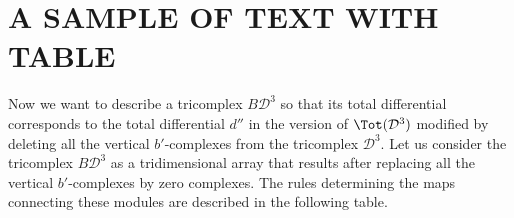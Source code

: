 \section{A SAMPLE OF TEXT WITH TABLE}\label{table}
\hspace{\parindent}
Now we want to describe a tricomplex $B{\mathcal D}^3$
so that its total differential corresponds to the total differential $d''$ in the
version of $\Tot ({\mathcal D}^3)$ modified by deleting all the
vertical  $b'$-complexes from the tricomplex ${\mathcal D}^3$.
Let us consider the tricomplex $B{\mathcal D}^3$ as a tridimensional array
that results after replacing all the vertical $b'$-complexes by zero complexes.
The rules determining the maps connecting these modules are described in the following table.
